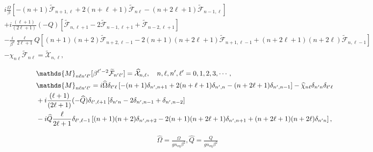 \documentclass[aps,prd,preprint,nofootinbib,amsmath,amssymb,showpacs,longbibliography,singlecolumn,superscriptaddress,10pt]{revtex4-1}
\theoremstyle{plain}
\theoremstyle{definition}
\begin{document}
%
\begin{equation}
\label{eq:F-moments-lin-problem-apn}
\begin{aligned}
&
i \frac{\Omega}{\beta} \left[
-(n+1) 
\widetilde{\mathcal{F}}_{n+1,\ell}+
2(n+\ell+1)
\widetilde{\mathcal{F}}_{n\ell}
-
(n+2\ell+1)
\widetilde{\mathcal{F}}_{n-1,\ell}
\right]
\\
&
+ 
i \frac{(\ell + 1)}{(2 \ell + 1)} (-Q) \left[ \widetilde{\mathcal{F}}_{n,\ell+1}
-
2 \widetilde{\mathcal{F}}_{n-1,\ell+1}
+
\widetilde{\mathcal{F}}_{n-2,\ell+1}
\right]
\\
&
-
\frac{i}{\beta^{2}}
 \frac{\ell}{2 \ell + 1}
Q
\left[
(n+1)(n+2)
\widetilde{\mathcal{F}}_{n+2,\ell-1}
-
2(n+1)(n+2\ell+1)
\widetilde{\mathcal{F}}_{n+1,\ell-1}
+
(n+2\ell+1)(n+2\ell)
\widetilde{\mathcal{F}}_{n,\ell-1}
\right]
\\
&
-
\chi_{n\ell}
\widetilde{\mathcal{F}}_{n\ell} 
   = 
\widetilde{\mathcal{X}}_{n,\ell} 
,
\end{aligned}
\end{equation}


%
\begin{subequations}
\label{eq:inhomog-case-lin-prob}
\begin{align}
&
\label{eq:inhomog-case-lin-prob-a}
\mathds{M}_{n \ell n' \ell'} [\beta^{\ell'-2}\widetilde{\mathcal{F}}_{n'\ell'}]
=
\widehat{\mathcal{X}}_{n, \ell},
\quad
n, \ell, n', \ell' = 0,1,2,3, \cdots,
\\
&
\mathds{M}_{n \ell n' \ell'} = i \widehat{\Omega} \delta_{\ell'\ell} \left[
-(n+1) 
\delta_{n',n+1}
+
2(n+\ell+1)
\delta_{n',n}
-
(n+2\ell+1)
\delta_{n',n-1}
\right]
-
\widehat{\chi}_{n\ell}
\delta_{n' n} \delta_{\ell' \ell}
\notag
\\
&
+ 
i \frac{(\ell + 1)}{(2 \ell + 1)} (-\widehat{Q}) \delta_{\ell',\ell+1} \left[ \delta_{n'n}
-
2 \delta_{n',n-1}
+
\delta_{n',n-2}
\right]
\notag
\\
&
\label{eq:inhomog-case-lin-prob-b}
-
i \widehat{Q}
 \frac{\ell}{2 \ell + 1}
 \delta_{\ell',\ell-1}
\left[
(n+1)(n+2)
\delta_{n',n+2} 
-
2(n+1)(n+2\ell+1)
\delta_{n', n+1}
+
(n+2\ell+1)(n+2\ell)
\delta_{n' n} 
\right],
\end{align}    
\end{subequations}

\begin{equation}
\begin{aligned}
&
\widehat{\Omega} = \frac{\Omega}{g n_{\mathrm{eq}} \beta^{2}},
\widehat{Q} = \frac{Q}{g n_{\mathrm{eq}} \beta^{2}}
\end{aligned}    
\end{equation}
\end{document}
